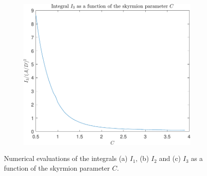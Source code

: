 \begin{figure}[h!]
\begin{subfigure}{.49\textwidth}
  \centering
  \includegraphics[width=\linewidth]{Figures/I3Plot.pdf}
  \caption{}
  \label{fig:ThetaInt3}
\end{subfigure}
\caption{Numerical evaluations of the integrals (a) $I_1$, (b) $I_2$ and (c) $I_3$ as a function of the skyrmion parameter $C$.}
\label{fig:ThetaInts}
\end{figure}

